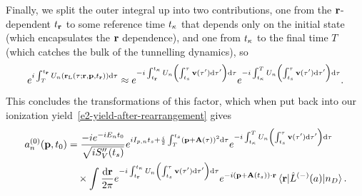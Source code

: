 Finally, we split the outer integral up into two contributions, one from the $\vb{r}$-dependent ${t_{\vb{r}}}$ to some reference time ${t_\kappa}$ that depends only on the initial state (which encapsulates the $\vb{r}$ dependence), and one from ${t_\kappa}$ to the final time $T$ (which catches the bulk of the tunnelling dynamics), so 
\begin{equation}
e^{i\int_T^{t_{\vb{r}}} U_n(\vb{r}_\mathrm{L}(\tau;\vb{r},\vb{p},{t_{\vb{r}}}))\mathrm{d}\tau}
\approx 
e^{-i\int_{t_{\vb{r}}}^{t_\kappa} U_n\left(\int_{ {t_s}}^\tau \vb{v}(\tau')\mathrm{d}\tau'\right) \mathrm{d}\tau}
e^{-i\int_{t_\kappa}^T U_n\left(\int_{ {t_s}}^\tau \vb{v}(\tau')\mathrm{d}\tau'\right) \mathrm{d}\tau}.
\end{equation}
This concludes the transformations of this factor, which when put back into our ionization yield~\eqref{e2-yield-after-rearrangement} gives 
\begin{align}
a_n^{(0)}(\vb{p},\tn)
& =
\frac{-i e^{-iE_n\tn}}{\sqrt{iS_V''(\ts)}}
e^{iI_{p,n} \ts + \frac{i}{2} \int_T^{\ts}\left(\vbp+\vba(\tau)\right)^2\d\tau }
e^{-i\int_\tk^T U_n\left(\int_{ \ts}^\tau \vb{v}(\tau')\d\tau'\right) \d\tau}
\nonumber \\ & \quad \times
\int\frac{\d\vbr}{2\pi}
e^{-i\int_\tvr^\tk U_n\left(\int_{ \ts}^\tau \vb{v}(\tau')\d\tau'\right) \d\tau}
e^{-i\left(\vbp+\vba(\ts)\right)\cdot\vb{r}}
\matrixel{\vbr}{\hat{L}^{(-)}(a)}{n_D}
.
\label{e2-ionization-yield-separated}
\end{align}


